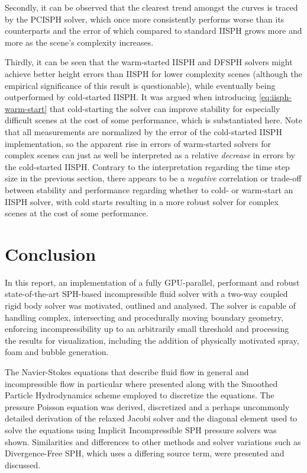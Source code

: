 \documentclass[oneside, a4paper]{book}
\begin{document}
  Secondly, it can be observed that the clearest trend amongst the curves is traced by the PCISPH solver, which once more consistently performs worse than its counterparts and the error of which compared to standard IISPH grows more and more as the scene's complexity increases. 

  Thirdly, it can be seen that the warm-started IISPH and DFSPH solvers might achieve better height errors than IISPH for lower complexity scenes (although the empirical significance of this result is questionable), while eventually being outperformed by cold-started IISPH. It was argued when introducing \autoref{eq:iisph-warm-start} that cold-starting the solver can improve stability for especially difficult scenes at the cost of some performance, which is substantiated here. Note that all measurements are normalized by the error of the cold-started IISPH implementation, so the apparent rise in errors of warm-started solvers for complex scenes can just as well be interpreted as a relative \textit{decrease} in errors by the cold-started IISPH. Contrary to the interpretation regarding the time step size in the previous section, there appears to be a \textit{negative} correlation or trade-off between stability and performance regarding whether to cold- or warm-start an IISPH solver, with cold starts resulting in a more robust solver for complex scenes at the cost of some performance. 

  


  \chapter{Conclusion}\label{chp:conclusion}
  In this report, an implementation of a fully GPU-parallel, performant and robust state-of-the-art SPH-based incompressible fluid solver with a two-way coupled rigid body solver was motivated, outlined and analysed. The solver is capable of handling complex, intersecting and procedurally moving boundary geometry, enforcing incompressibility up to an arbitrarily small threshold and processing the results for visualization, including the addition of physically motivated spray, foam and bubble generation. 
  
  The Navier-Stokes equations that describe fluid flow in general and incompressible flow in particular where presented along with the Smoothed Particle Hydrodynamics scheme employed to discretize the equations. The pressure Poisson equation was derived, discretized and a perhaps uncommonly detailed derivation of the relaxed Jacobi solver and the diagonal element used to solve the equations using Implicit Incompressible SPH pressure solvers was shown. Similarities and differences to other methods and solver variations such as Divergence-Free SPH, which uses a differing source term, were presented and discussed.
\end{document}
